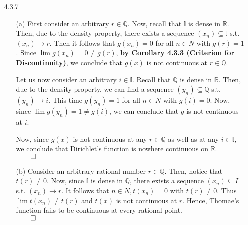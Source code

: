 \documentclass[11pt]{article}
\newcommand{\reals}{\mathbb{R}}
\newcommand{\rats}{\mathbb{Q}}
\newcommand{\irrats}{\mathbb{I}}
\begin{document}
\begin{itemize}
    \item[4.3.7]
        \begin{itemize}
            \item[(a)]
                First consider an arbitrary $r \in \rats$. Now, recall that
                $\irrats$ is dense in $\reals$. Then, due to the density
                property, there exists a sequence $(x_n) \subseteq \irrats$
                s.t. $(x_n) \to r$. Then it follows that $g(x_n) = 0$ for all
                $n \in N$ with $g(r) = 1$. Since $\lim g(x_n) = 0 \neq g(r)$,
                \textbf{by Corollary 4.3.3 (Criterion for Discontinuity)}, we
                conclude that $g(x)$ is not continuous at $r \in \rats$.

                Let us now consider an arbitrary $i \in \irrats$. Recall that
                $\rats$ is dense in $\reals$. Then, due to the density
                property, we can find a sequence $(y_n) \subseteq \rats$ s.t.
                $(y_n) \to i$. This time $g(y_n) = 1$ for all $n \in N$
                with $g(i) = 0$. Now, since $\lim g(y_n) = 1 \neq g(i)$, we can
                conclude that $g$ is not continuous at $i$.

                Now, since $g(x)$ is not continuous at any $r \in \rats$ as
                well as at any $i \in \irrats$, we conclude that Dirichlet's
                function is nowhere continuous on $\reals$.\\
                $\qed$

            \item[(b)]
                Consider an arbitrary rational number $r \in \rats$. Then,
                notice that $t(r) \neq 0$. Now, since $\irrats$ is dense in
                $\rats$, there exists a sequence $(x_n) \subseteq I$ s.t.
                $(x_n) \to r$.  It follows that $n \in N, t(x_n) = 0$ with
                $t(r) \neq 0$.  Thus $\lim t(x_n) \neq t(r)$ and $t(x)$ is not
                continuous at $r$.  Hence, Thomae's function fails to be
                continuous at every rational point.\\
                $\qed$


\end{itemize}
\end{itemize}
\end{document}
